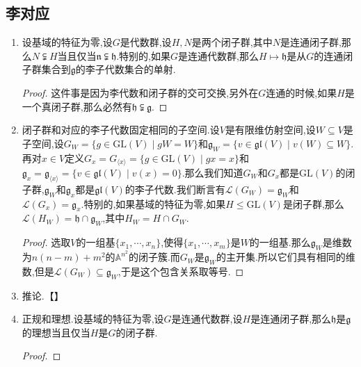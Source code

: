 \subsection{李对应}
\begin{enumerate}
	\item 设基域的特征为零,设$G$是代数群,设$H,N$是两个闭子群,其中$N$是连通闭子群,那么$N\subsetneqq H$当且仅当$\mathfrak{n}\subsetneqq\mathfrak{h}$.特别的,如果$G$是连通代数群,那么$H\mapsto\mathfrak{h}$是从$G$的连通闭子群集合到$\mathfrak{g}$的李子代数集合的单射.
	\begin{proof}
		
		这件事是因为李代数和闭子群的交可交换,另外在$G$连通的时候,如果$H$是一个真闭子群,那么必然有$\mathfrak{h}\subsetneqq\mathfrak{g}$.
	\end{proof}
    \item 闭子群和对应的李子代数固定相同的子空间.设$V$是有限维仿射空间,设$W\subseteq V$是子空间,设$G_W=\{g\in\mathrm{GL}(V)\mid gW=W\}$和$\mathfrak{g}_W=\{v\in\mathfrak{gl}(V)\mid v(W)\subseteq W\}$.再对$x\in V$定义$G_x=G_{\langle x\rangle}=\{g\in\mathrm{GL}(V)\mid gx=x\}$和$\mathfrak{g}_x=\mathfrak{g}_{\langle x\rangle}=\{v\in\mathfrak{gl}(V)\mid v(x)=0\}$.那么我们知道$G_W$和$G_x$都是$\mathrm{GL}(V)$的闭子群,$\mathfrak{g}_W$和$\mathfrak{g}_x$都是$\mathfrak{gl}(V)$的李子代数.我们断言有$\mathscr{L}(G_W)=\mathfrak{g}_W$和$\mathscr{L}(G_x)=\mathfrak{g}_x$.特别的,如果基域的特征为零,如果$H\le\mathrm{GL}(V)$是闭子群,那么$\mathscr{L}(H_W)=\mathfrak{h}\cap\mathfrak{g}_W$,其中$H_W=H\cap G_W$.
    \begin{proof}
    	
    	选取$V$的一组基$\{x_1,\cdots,x_n\}$,使得$\{x_1,\cdots,x_m\}$是$W$的一组基.那么$\mathfrak{g}_W$是维数为$n(n-m)+m^2$的$\mathbb{A}^{n^2}$的闭子簇.而$G_W$是$\mathfrak{g}_W$的主开集.所以它们具有相同的维数,但是$\mathscr{L}(G_W)\subseteq\mathfrak{g}_W$,于是这个包含关系取等号.
    \end{proof}
    \item 推论.【】
    \item 正规和理想.设基域的特征为零,设$G$是连通代数群,设$H$是连通闭子群,那么$\mathfrak{h}$是$\mathfrak{g}$的理想当且仅当$H$是$G$的闭子群.
    \begin{proof}
    	

\end{proof}
\end{enumerate}
